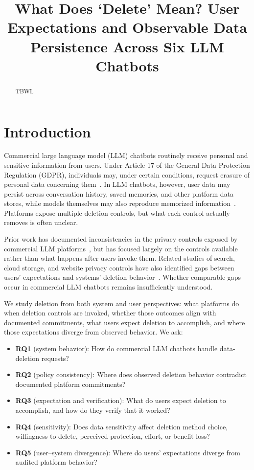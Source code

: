 \documentclass[conference,compsoc]{IEEEtran}
\title{What Does `Delete' Mean? User Expectations and Observable Data Persistence Across Six LLM Chatbots}
\author{\IEEEauthorblockN{Anonymous Author(s)}
\IEEEauthorblockA{Submission \#XXX}}
\begin{document}
\maketitle

\begin{abstract}
TBWL
\end{abstract}

\section{Introduction}
\label{sec:intro}

Commercial large language model (LLM) chatbots routinely receive personal
and sensitive information from users. Under Article 17 of the General Data
Protection Regulation (GDPR), individuals may, under certain conditions,
request erasure of personal data concerning them~\cite{gdpr2016}. In LLM
chatbots, however, user data may persist across conversation history,
saved memories, and other platform data stores, while models themselves
may also reproduce memorized information~\cite{carlini2021extracting}.
Platforms expose multiple deletion controls, but what each control
actually removes is often unclear.

Prior work has documented inconsistencies in the privacy controls exposed
by commercial LLM platforms~\cite{li2026privacy}, but has focused largely
on the controls available rather than what happens after users invoke
them. Related studies of search, cloud storage, and website privacy
controls have also identified gaps between users' expectations and
systems' deletion behavior~\cite{bertram2019five,kang2015mydata,
ramokapane2017stupid,habib2019empirical}. Whether comparable gaps occur
in commercial LLM chatbots remains insufficiently understood.

We study deletion from both system and user perspectives: what platforms
do when deletion controls are invoked, whether those outcomes align with
documented commitments, what users expect deletion to accomplish, and
where those expectations diverge from observed behavior. We ask:

\begin{itemize}[leftmargin=*]
\item[] \textbf{RQ1} (system behavior): How do commercial LLM chatbots
handle data-deletion requests?
\item[] \textbf{RQ2} (policy consistency): Where does observed deletion
behavior contradict documented platform commitments?
\item[] \textbf{RQ3} (expectation and verification): What do users expect
deletion to accomplish, and how do they verify that it worked?
\item[] \textbf{RQ4} (sensitivity): Does data sensitivity affect deletion
method choice, willingness to delete, perceived protection, effort, or
benefit loss?
\item[] \textbf{RQ5} (user--system divergence): Where do users'
expectations diverge from audited platform behavior?
\end{itemize}
\end{document}
